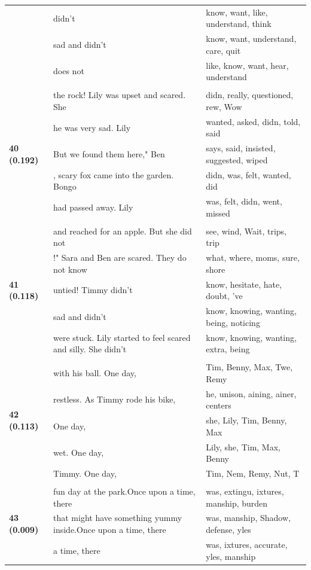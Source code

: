 \documentclass{article}
\theoremstyle{plain}
\theoremstyle{definition}
\theoremstyle{remark}
\begin{document}
\begin{longtable}{|p{}|p{}|p{}|}
& didn't & know,  want,  like,  understand,  think \\
& sad and didn't & know,  want,  understand,  care,  quit \\
& does not & like,  know,  want,  hear,  understand \\
& & \\
\multirow{5}{*}{\textbf{40 (0.192)}} & the rock! Lily was upset and scared. She & didn,  really,  questioned, rew, Wow \\
& he was very sad. Lily & wanted,  asked,  didn,  told,  said \\
& But we found them here," Ben & says,  said,  insisted,  suggested,  wiped \\
& , scary fox came into the garden. Bongo & didn,  was,  felt,  wanted,  did \\
& had passed away. Lily & was,  felt,  didn,  went,  missed \\
& & \\
\multirow{5}{*}{\textbf{41 (0.118)}} & and reached for an apple.  But she did not & see,  wind, Wait,  trips,  trip \\
& !"  Sara and Ben are scared. They do not know & what,  where,  moms,  sure,  shore \\
& untied! Timmy didn't & know,  hesitate,  hate,  doubt, 've \\
& sad and didn't & know,  knowing,  wanting,  being,  noticing \\
& were stuck. Lily started to feel scared and silly. She didn't & know,  knowing,  wanting,  extra,  being \\
& & \\
\multirow{5}{*}{\textbf{42 (0.113)}} & with his ball. One day, & Tim,  Benny,  Max,  Twe,  Remy \\
& restless.   As Timmy rode his bike, & he,  unison, aining, ainer,  centers \\
& One day, & she,  Lily,  Tim,  Benny,  Max \\
& wet. One day, & Lily,  she,  Tim,  Max,  Benny \\
& Timmy. One day, & Tim,  Nem,  Remy,  Nut,  T \\
& & \\
\multirow{5}{*}{\textbf{43 (0.009)}} & fun day at the park.Once upon a time, there & was,  extingu, ixtures, manship,  burden \\
& that might have something yummy inside.Once upon a time, there & was, manship, Shadow,  defense, yles \\
& a time, there & was, ixtures,  accurate, yles, manship \\

\end{longtable}
\end{document}
